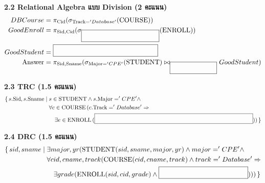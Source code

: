 \documentclass[a4paper,12pt]{article}
\newcommand{\blank}[1]{\fbox{\rule{0pt}{1.1em}\hspace{#1}}}
\begin{document}
\vspace{0.1cm}
\textbf{2.2 Relational Algebra แบบ Division (2 คะแนน)}
\[
\begin{aligned}
DBCourse &= \pi_{\text{Cid}}(\sigma_{\text{Track}='Database'}(\text{COURSE}))\\
GoodEnroll &= \pi_{\text{Sid},\text{Cid}}(\sigma_{\blank{3.8cm}}(\text{ENROLL}))\\
GoodStudent &= \blank{5.2cm}\\
\text{Answer} &= \pi_{\text{Sid},\text{Sname}}(\sigma_{\text{Major}='CPE'}(\text{STUDENT}) \bowtie_{\blank{2.2cm}} GoodStudent)
\end{aligned}
\]

\vspace{0.1cm}
\textbf{2.3 TRC (1.5 คะแนน)}
\[
\begin{aligned}
\{\, s.\text{Sid},s.\text{Sname} \mid\;& s \in \text{STUDENT} \land s.\text{Major}='CPE' \land\\
&\forall c \in \text{COURSE}\,
(c.\text{Track}='Database' \Rightarrow\\
&\quad \exists e \in \text{ENROLL}\,(\blank{9.5cm})) \,\}
\end{aligned}
\]

\vspace{0.1cm}
\textbf{2.4 DRC (1.5 คะแนน)}
\[
\begin{aligned}
\{\, sid,sname \mid\;& \exists major,yr(
\text{STUDENT}(sid,sname,major,yr) \land major='CPE' \land\\
&\forall cid,cname,track(\text{COURSE}(cid,cname,track) \land track='Database' \Rightarrow\\
&\quad \exists grade(\text{ENROLL}(sid,cid,grade) \land \blank{4.4cm}))) \,\}
\end{aligned}
\]

\newpage
\end{document}
